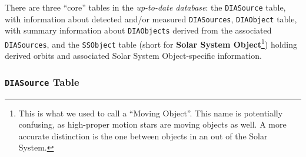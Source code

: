 \documentclass[12pt]{article}
\newcommand{\code}[1]{\texttt{#1}}
\newcommand{\DIASource}{\code{DIASource}\xspace}
\newcommand{\DIASources}{\code{DIASources}\xspace}
\newcommand{\DIAObject}{\code{DIAObject}\xspace}
\newcommand{\DIAObjects}{\code{DIAObjects}\xspace}
\newcommand{\DB}{{\em up-to-date database}\xspace}
\newcommand{\SSObject}{\code{SSObject}\xspace}
\begin{document}
There are three ``core'' tables in the \DB: the \DIASource table, with information about detected and/or measured \DIASources, \DIAObject table, with summary information about \DIAObjects derived from the associated \DIASources, and the \SSObject table (short for {\bf Solar System Object}\footnote{This is what we used to call a ``Moving Object''. This name is potentially confusing, as high-proper motion stars are moving objects as well. A more accurate distinction is the one between objects in an out of the Solar System.}) holding derived orbits and associated Solar System Object-specific information.

\subsubsection{\DIASource Table}
\end{document}
